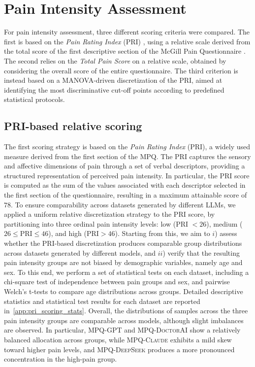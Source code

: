 \documentclass[preprint,12pt,authoryear]{elsarticle}
\newcommand{\dbGPT}{\small\textsc{MPQ-GPT}\xspace}
\newcommand{\dbClaude}{\small\textsc{MPQ-Claude}\xspace}
\newcommand{\dbDeepSeek}{\small\textsc{MPQ-DeepSeek}\xspace}
\newcommand{\dbDoctorAI}{\small\textsc{MPQ-DoctorAI}\xspace}
\begin{document}
\section{Pain Intensity Assessment\label{sec:sec5}}
For pain intensity assessment, three different scoring criteria were compared. The first is based on the \textit{Pain Rating Index} (PRI) \citep{melzack1975mcgill}, using a relative scale derived from the total score of the first descriptive section of the McGill Pain Questionnaire \citep{melzack1975mcgill}. The second relies on the \textit{Total Pain Score} on a relative scale, obtained by considering the overall score of the entire questionnaire. The third criterion is instead based on a MANOVA-driven discretization of the PRI, aimed at identifying the most discriminative cut-off points according to predefined statistical protocols. 

\subsection{PRI-based relative scoring \label{sec:painscoring}} 
The first scoring strategy is based on the \textit{Pain Rating Index} (PRI), a widely used measure derived from the first section of the MPQ. The PRI captures the sensory and affective dimensions of pain through a set of verbal descriptors, providing a structured representation of perceived pain intensity. In particular, the PRI score is computed as the sum of the values associated with each descriptor selected in the first section of the questionnaire, resulting in a maximum attainable score of $78$. To ensure comparability across datasets generated by different LLMs, we applied a uniform relative discretization strategy to the PRI score, by partitioning into three ordinal pain intensity levels: low (PRI $< 26$), medium ($26 \leq \text{PRI} \leq 46$), and high ($\text{PRI} > 46$). 
Starting from this, we aim to $i$) assess whether the PRI-based discretization produces comparable group distributions across datasets generated by different models, and $ii$) verify that the resulting pain intensity groups are not biased by demographic variables, namely age and sex. To this end, we perform a set of statistical tests on each dataset, including a chi-square test of independence between pain groups and sex, and pairwise Welch’s t-tests to compare age distributions across groups. Detailed descriptive statistics and statistical test results for each dataset are reported in~\ref{app:pri_scoring_stats}. Overall, the distributions of samples across the three pain intensity groups are comparable across models, although slight imbalances are observed. In particular, \dbGPT and \dbDoctorAI show a relatively balanced allocation across groups, while \dbClaude exhibits a mild skew toward higher pain levels, and \dbDeepSeek produces a more pronounced concentration in the high-pain group.
\end{document}
